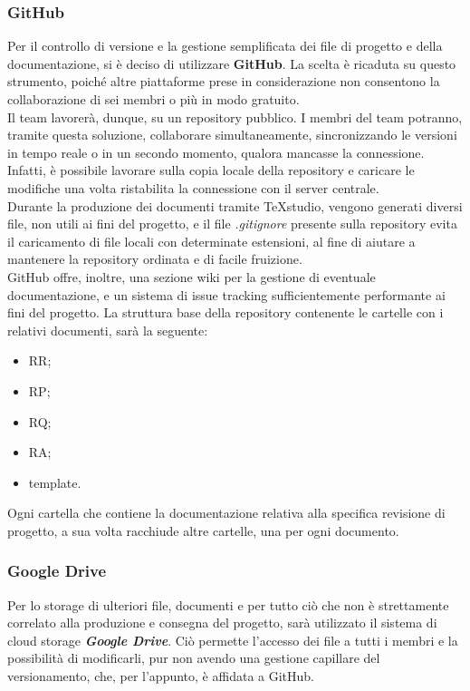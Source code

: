 		\subsubsection{GitHub}
		Per il controllo di versione e la gestione semplificata dei file di progetto e della documentazione, si è deciso di utilizzare \textbf{GitHub}. La scelta è ricaduta su questo strumento, poiché altre piattaforme prese in considerazione non consentono la collaborazione di sei membri o più in modo gratuito.\\
		Il team lavorerà, dunque, su un repository pubblico. I membri del team potranno, tramite questa soluzione, collaborare simultaneamente, sincronizzando le versioni in tempo reale o in un secondo momento, qualora mancasse la connessione.\\
		Infatti, è possibile lavorare sulla copia locale della repository e caricare le modifiche una volta ristabilita la connessione con il server centrale.\\ Durante la produzione dei documenti tramite TeXstudio, vengono generati diversi file, non utili ai fini del progetto, e il file \textit{.gitignore} presente sulla repository evita il caricamento di file locali con determinate estensioni, al fine di aiutare a mantenere la repository ordinata e di facile fruizione.\\
		GitHub offre, inoltre, una sezione wiki per la gestione di eventuale documentazione, e un sistema di issue tracking sufficientemente performante ai fini del progetto. 
		La struttura base della repository contenente le cartelle con i relativi documenti, sarà la seguente:
		\begin{itemize}
			\item RR;
			\item RP;
			\item RQ;
			\item RA;
			\item template.
		\end{itemize}
		Ogni cartella che contiene la documentazione relativa alla specifica revisione di progetto, a sua volta racchiude altre cartelle, una per ogni documento.

		\subsubsection{Google Drive}
		Per lo storage di ulteriori file, documenti e per tutto ciò che non è strettamente correlato alla produzione e consegna del progetto, sarà utilizzato il sistema di cloud storage \textbf{\textit{Google Drive}}. Ciò permette l'accesso dei file a tutti i membri e la possibilità di modificarli, pur non avendo una gestione capillare del versionamento, che, per l'appunto, è affidata a GitHub.

